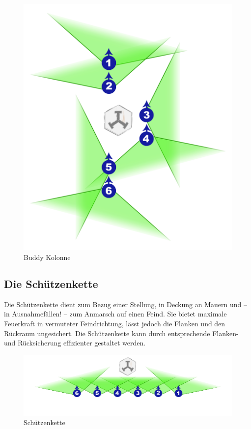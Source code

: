 \begin{figure}[htbp]
\begin{minipage}[t]{7 cm}
	\includegraphics[width=1\linewidth]{./img/grundlagen/formationen/kolonne_6mann.jpg}
	\caption{Buddy Kolonne}
	\label{K6M}
	\end{minipage}
	
\end{figure}

\subsection{Die Schützenkette}
Die Schützenkette dient zum Bezug einer Stellung, in Deckung an Mauern und -- in Ausnahmefällen! -- zum Anmarsch auf einen Feind. Sie bietet maximale Feuerkraft in vermuteter Feindrichtung, lässt jedoch die Flanken und den Rückraum ungesichert. Die Schützenkette kann  durch entsprechende Flanken- und Rücksicherung effizienter gestaltet werden.\\
\begin{figure}[htbp]
	\centering
	\includegraphics[width=0.95\linewidth]{./img/grundlagen/formationen/kette_6mann.jpg}
		\caption{Schützenkette}
\end{figure}